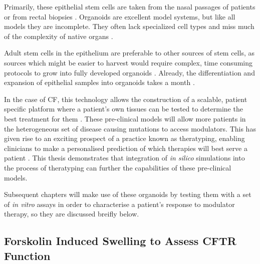 Primarily, these epithelial stem cells are taken from the nasal passages of patients or from rectal biopsies \cite{}. Organoids are excellent model systems, but like all models they are incomplete. They often lack specialized cell types and miss much of the complexity of native organs \cite{clevers2016}. 

Adult stem cells in the epithelium are preferable to other sources of stem cells, as sources which might be easier to harvest would require complex, time consuming protocols to grow into fully developed organoids \cite{wong2012}. Already, the differentiation and expansion of epithelial samples into organoids takes a month \cite{sato2011}.

In the case of CF, this technology allows the construction of a scalable, patient specific platform where a patient's own tissues can be tested to determine the best treatment for them \cite{keegan2021, sato2011}. These pre-clinical models will allow more patients in the heterogeneous set of disease causing mutations to access modulators. This has given rise to an exciting prospect of a practice known as theratyping, enabling clinicians to make a personalised prediction of which therapies will best serve a patient \cite{clancy2019, wong2022, wong2022a, ciciriello2022}. This thesis demonstrates that integration of \textit{in silico} simulations into the process of theratyping can further the capabilities of these pre-clinical models.

Subsequent chapters will make use of these organoids by testing them with a set of \textit{in vitro} assays in order to characterise a patient's response to modulator therapy, so they are discussed breifly below.

\subsection{Forskolin Induced Swelling to Assess CFTR Function}

